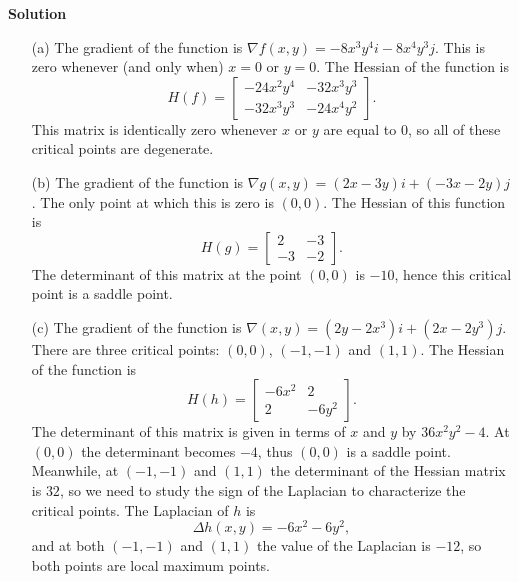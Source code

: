\documentclass[12pt,oneside]{exam}
\newenvironment{newsolution}{\vspace{.1in}\noindent\textbf{Solution \hspace{.05em}}}{}
\begin{document}
\begin{newsolution}
\begin{itemize}
\item[(a)] The gradient of the function is $\nabla f (x,y)= -8x^3y^4i -8x^4y^3j$. This is zero whenever (and only when) $x=0$ or $y=0$. The Hessian of the function is 
\begin{equation*}
H(f)= \left[
\begin{matrix}
-24x^2y^4 & -32x^3y^3\\
-32x^3y^3 & -24x^4y^2
\end{matrix}
\right].
\end{equation*}
This matrix is identically zero whenever $x$ or $y$ are equal to $0$, so all of these critical points are degenerate. 
\item[(b)] The gradient of the function is $\nabla g (x,y)= (2x-3y)i+(-3x-2y)j$. The only point at which this is zero is $(0,0)$. The Hessian of this function is 
\begin{equation*}
H(g)= \left[
\begin{matrix}
2 & -3\\
-3 & -2
\end{matrix}
\right].
\end{equation*}
The determinant of this matrix at the point $(0,0)$ is $-10$, hence this critical point is a saddle point. 
\item[(c)] The gradient of the function is $\nabla(x,y)= (2y-2x^3)i + (2x-2y^3)j$. There are three critical points: $(0,0)$, $(-1,-1)$ and $(1,1)$. The Hessian of the function is 
\begin{equation*}
H(h)= \left[
\begin{matrix}
-6x^2 & 2\\
2 & -6y^2
\end{matrix}
\right].
\end{equation*}
The determinant of this matrix is given in terms of $x$ and $y$ by $36x^2y^2-4$. At $(0,0)$ the determinant becomes $-4$, thus $(0,0)$ is a saddle point. Meanwhile, at $(-1,-1)$ and $(1,1)$ the determinant of the Hessian matrix is $32$, so we need to study the sign of the Laplacian to characterize the critical points. The Laplacian of $h$ is 
\begin{equation*}
\Delta h (x,y)=-6x^2-6y^2,
\end{equation*}
and at both $(-1,-1)$ and  $(1,1)$ the value of the Laplacian is $-12$, so both points are local maximum points. 
\end{itemize}
\end{newsolution}
\end{document}
